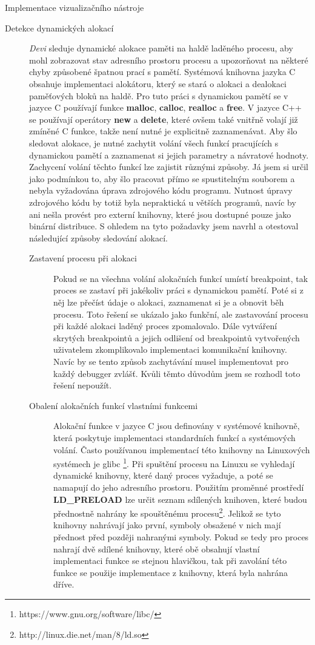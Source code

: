 \documentclass[bc,male,python,dept460]{diploma}						%
\begin{document}
\begin{section}{Implementace vizualizačního nástroje}
\begin{description}
			\item[Detekce dynamických alokací]
			\textit{Devi} sleduje dynamické alokace paměti na haldě laděného procesu, aby mohl zobrazovat stav adresního prostoru procesu a upozorňovat na některé
			chyby způsobené špatnou prací s pamětí. Systémová knihovna jazyka C obsahuje implementaci alokátoru, který se stará o alokaci a dealokaci paměťových
			bloků na haldě. Pro tuto práci s dynamickou pamětí se v jazyce C používají funkce \textbf{malloc}, \textbf{calloc}, \textbf{realloc}
			a \textbf{free}. V jazyce C++ se používají operátory \textbf{new} a \textbf{delete}, které ovšem také vnitřně volají již zmíněné C funkce, takže není
			nutné je explicitně zaznamenávat. Aby šlo sledovat alokace, je nutné zachytit volání všech funkcí pracujících s dynamickou pamětí a zaznamenat si
			jejich parametry a návratové hodnoty. Zachycení volání těchto funkcí lze zajistit různými způsoby. Já jsem si určil jako podmínkou to, aby šlo pracovat
			přímo se spustitelným souborem a nebyla vyžadována úprava zdrojového kódu programu.
			Nutnost úpravy zdrojového kódu by totiž byla nepraktická u větších programů, navíc by ani nešla provést pro externí knihovny, které jsou dostupné pouze
			jako binární distribuce.
			S ohledem na tyto požadavky jsem navrhl a otestoval následující způsoby sledování alokací.
			\begin{description}
				\item[Zastavení procesu při alokaci] Pokud se na všechna volání alokačních funkcí umístí breakpoint, tak proces se zastaví při jakékoliv práci s
				dynamickou pamětí. Poté si z něj lze přečíst údaje o alokaci, zaznamenat si je a obnovit běh procesu. Toto řešení se ukázalo jako funkční,
				ale zastavování procesu při každé alokaci laděný proces zpomalovalo. Dále vytváření skrytých breakpointů a jejich odlišení od breakpointů vytvořených
				uživatelem zkomplikovalo implementaci komunikační knihovny. Navíc by se tento způsob zachytávání musel
				implementovat pro každý debugger zvlášť. Kvůli těmto důvodům jsem se rozhodl toto řešení nepoužít.
				
				\item[Obalení alokačních funkcí vlastními funkcemi] Alokační funkce v jazyce C jsou definovány v systémové knihovně, která poskytuje
				implementaci standardních funkcí a systémových volání. Často používanou implementací této knihovny na Linuxových systémech je glibc
				\footnote{https://www.gnu.org/software/libc/}. Při spuštění procesu na Linuxu se vyhledají dynamické knihovny, které daný proces vyžaduje,
				a poté se namapují do jeho adresního prostoru. Použitím proměnné prostředí \textbf{LD\_PRELOAD} lze určit
				seznam sdílených knihoven, které budou přednostně nahrány ke spouštěnému procesu\footnote{http://linux.die.net/man/8/ld.so}.
				Jelikož se tyto knihovny nahrávají jako první, symboly obsažené v nich mají přednost před později nahranými symboly. Pokud se tedy pro proces
				nahrají dvě sdílené knihovny, které obě obsahují vlastní implementaci funkce se stejnou hlavičkou, tak při zavolání této funkce se použije
				implementace z knihovny, která byla nahrána dříve.
				

\end{description}
\end{description}
\end{section}
\end{document}
